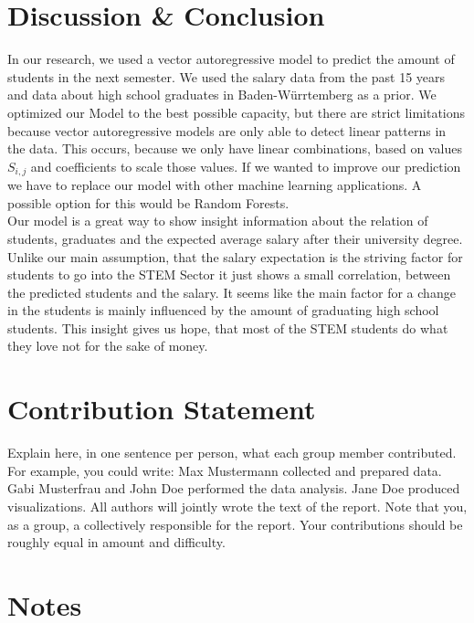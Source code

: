 \documentclass{article}
\theoremstyle{plain}
\theoremstyle{definition}
\theoremstyle{remark}
\begin{document}
\section{Discussion \& Conclusion}\label{sec:conclusion}
In our research, we used a vector autoregressive model to predict the amount of students in the next semester. 
We used the salary data from the past 15 years and data about high school graduates in Baden-Würrtemberg as a prior. We optimized our Model to the best possible capacity,
but there are strict limitations because vector autoregressive models are only able to detect linear patterns in the data. This occurs, because we only have linear combinations,
based on values $S_{i,j}$ and coefficients to scale those values. If we wanted to improve our prediction we have to replace our model with other machine learning applications.
A possible option for this would be Random Forests.\\
Our model is a great way to show insight information about the relation of students, graduates and the expected average salary after their university degree.
Unlike our main assumption, that the salary expectation is the striving factor for students to go into the STEM Sector it just shows a small correlation,
between the predicted students and the salary. It seems like the main factor for a change in the students is mainly influenced by the amount of graduating high school students.
This insight gives us hope, that most of the STEM students do what they love not for the sake of money.


\section*{Contribution Statement}
Explain here, in one sentence per person, what each group member contributed. For example, you could write: Max Mustermann collected and prepared data. Gabi Musterfrau and John Doe performed the data analysis. Jane Doe produced visualizations. All authors will jointly wrote the text of the report. Note that you, as a group, a collectively responsible for the report. Your contributions should be roughly equal in amount and difficulty.


\section*{Notes} 
\end{document}

